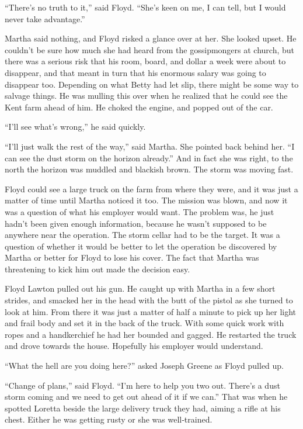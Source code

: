 \documentclass[ebook,12pt]{memoir}
\begin{document}
``There's no truth to it,'' said Floyd. ``She's keen on me, I can tell,
but I would never take advantage.''

Martha said nothing, and Floyd risked a glance over at her. She looked
upset. He couldn't be sure how much she had heard from the gossipmongers
at church, but there was a serious risk that his room, board, and dollar
a week were about to disappear, and that meant in turn that his enormous
salary was going to disappear too. Depending on what Betty had let slip,
there might be some way to salvage things. He was mulling this over when
he realized that he could see the Kent farm ahead of him. He choked the
engine, and popped out of the car.

``I'll see what's wrong,'' he said quickly.

``I'll just walk the rest of the way,'' said Martha. She pointed back
behind her. ``I can see the dust storm on the horizon already.'' And in
fact she was right, to the north the horizon was muddled and blackish
brown. The storm was moving fast.

Floyd could see a large truck on the farm from where they were, and it
was just a matter of time until Martha noticed it too. The mission was
blown, and now it was a question of what his employer would want. The
problem was, he just hadn't been given enough information, because he
wasn't supposed to be anywhere near the operation. The storm cellar had
to be the target. It was a question of whether it would be better to let
the operation be discovered by Martha or better for Floyd to lose his
cover. The fact that Martha was threatening to kick him out made the
decision easy.

Floyd Lawton pulled out his gun. He caught up with Martha in a few short
strides, and smacked her in the head with the butt of the pistol as she
turned to look at him. From there it was just a matter of half a minute
to pick up her light and frail body and set it in the back of the truck.
With some quick work with ropes and a handkerchief he had her bounded
and gagged. He restarted the truck and drove towards the house.
Hopefully his employer would understand.

``What the hell are you doing here?'' asked Joseph Greene as Floyd
pulled up.

``Change of plans,'' said Floyd. ``I'm here to help you two out. There's
a dust storm coming and we need to get out ahead of it if we can.'' That
was when he spotted Loretta beside the large delivery truck they had,
aiming a rifle at his chest. Either he was getting rusty or she was
well‐trained.
\end{document}
